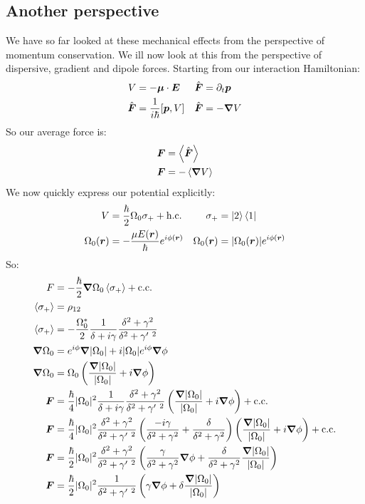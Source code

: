 \subsection{Another perspective}
We have so far looked at these mechanical effects from the perspective of momentum conservation. We ill now look at this from the perspective of dispersive, gradient and dipole forces. Starting from our interaction Hamiltonian:
\begin{align*}
	V &= -\bm{\mu}\cdot\bm{E} &
	\hat{\bm{F}} &= \partial_t \bm{p} \\
	\hat{\bm{F}} &= \frac{1}{i\hbar} [\bm{p}, V] &
	\hat{\bm{F}} &= -\bm{\nabla} V
\end{align*}
So our average force is:
\begin{align*}
	\bm{F} &= \expval{\hat{\bm{F}}} \\
	\bm{F} &= -\expval{\bm{\nabla}V}
\end{align*}
We now quickly express our potential explicitly:
\begin{align*}
	V &= \frac{\hbar}{2}\Omega_0\sigma_+ + \text{h.c.} &
	\sigma_+ &= \ket{2}\bra{1} \\
	\Omega_0(\bm{r}) &= -\frac{\mu E(\bm{r})}{\hbar} e^{i\phi(\bm{r})} & 
	\Omega_0(\bm{r}) &= |\Omega_0(\bm{r})|e^{i\phi(\bm{r})}
\end{align*}
So:
\begin{align*}
	F &= -\frac{\hbar}{2}\bm{\nabla} \Omega_0\expval{\sigma_+} + \text{c.c.} \\
	\expval{\sigma_+} &= \rho_{12} \\
	\expval{\sigma_+} &= -\frac{\Omega_0^*}{2} \frac{1}{\delta + i\gamma} \frac{\delta^2 + \gamma^2}{\delta^2 + \gamma'\ ^2} \\
	\bm{\nabla} \Omega_0 &= e^{i\phi}\bm{\nabla} |\Omega_0| + i|\Omega_0| e^{i\phi} \bm{\nabla} \phi \\
	\bm{\nabla} \Omega_0 &= \Omega_0 \left(\frac{\bm{\nabla}|\Omega_0|}{|\Omega_0|} + i\bm{\nabla}\phi\right) \\
	\bm{F} &= \frac{\hbar}{4}|\Omega_0|^2 \frac{1}{\delta + i\gamma}\frac{\delta^2 + \gamma^2}{\delta^2 + \gamma'\ ^2} \left(\frac{\bm{\nabla}|\Omega_0|}{|\Omega_0|} + i\bm{\nabla}\phi\right) + \text{c.c.} \\
	\bm{F} &= \frac{\hbar}{4}|\Omega_0|^2 \frac{\delta^2 + \gamma^2}{\delta^2 + \gamma'\ ^2}\left(\frac{-i\gamma}{\delta^2 + \gamma^2} + \frac{\delta}{\delta^2 + \gamma^2}\right) \left(\frac{\bm{\nabla}|\Omega_0|}{|\Omega_0|} + i\bm{\nabla}\phi\right) + \text{c.c.} \\
	\bm{F} &= \frac{\hbar}{2}|\Omega_0|^2 \frac{\delta^2 + \gamma^2}{\delta^2 + \gamma'\ ^2}\left(\frac{\gamma}{\delta^2 + \gamma^2} \bm{\nabla}\phi + \frac{\delta}{\delta^2 + \gamma^2} \frac{\bm{\nabla}|\Omega_0|}{|\Omega_0|}\right) \\
	\bm{F} &= \frac{\hbar}{2}|\Omega_0|^2 \frac{1}{\delta^2 + \gamma'\ ^2}\left(\gamma\bm{\nabla}\phi + \delta\frac{\bm{\nabla}|\Omega_0|}{|\Omega_0|}\right)
\end{align*}
